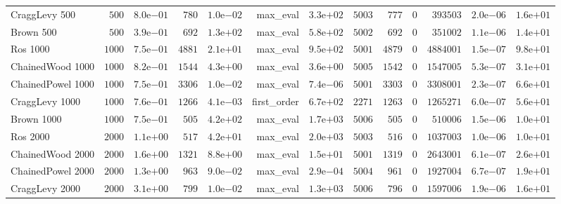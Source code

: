 \begin{longtable}[c]{lrrrrrrrrrrrr}
CraggLevy 500 & \(  500\) & \( 8.0\)e\(-01\) & \(  780\) & \( 1.0\)e\(-02\) & max\_eval & \( 3.3\)e\(+02\) & \( 5003\) & \(  777\) & \(    0\) & \(393503\) & \( 2.0\)e\(-06\) & \( 1.6\)e\(+01\) \\
Brown 500 & \(  500\) & \( 3.9\)e\(-01\) & \(  692\) & \( 1.3\)e\(+02\) & max\_eval & \( 5.8\)e\(+02\) & \( 5002\) & \(  692\) & \(    0\) & \(351002\) & \( 1.1\)e\(-06\) & \( 1.4\)e\(+01\) \\
Ros 1000 & \( 1000\) & \( 7.5\)e\(-01\) & \( 4881\) & \( 2.1\)e\(+01\) & max\_eval & \( 9.5\)e\(+02\) & \( 5001\) & \( 4879\) & \(    0\) & \(4884001\) & \( 1.5\)e\(-07\) & \( 9.8\)e\(+01\) \\
ChainedWood 1000 & \( 1000\) & \( 8.2\)e\(-01\) & \( 1544\) & \( 4.3\)e\(+00\) & max\_eval & \( 3.6\)e\(+00\) & \( 5005\) & \( 1542\) & \(    0\) & \(1547005\) & \( 5.3\)e\(-07\) & \( 3.1\)e\(+01\) \\
ChainedPowel 1000 & \( 1000\) & \( 7.5\)e\(-01\) & \( 3306\) & \( 1.0\)e\(-02\) & max\_eval & \( 7.4\)e\(-06\) & \( 5001\) & \( 3303\) & \(    0\) & \(3308001\) & \( 2.3\)e\(-07\) & \( 6.6\)e\(+01\) \\
CraggLevy 1000 & \( 1000\) & \( 7.6\)e\(-01\) & \( 1266\) & \( 4.1\)e\(-03\) & first\_order & \( 6.7\)e\(+02\) & \( 2271\) & \( 1263\) & \(    0\) & \(1265271\) & \( 6.0\)e\(-07\) & \( 5.6\)e\(+01\) \\
Brown 1000 & \( 1000\) & \( 7.5\)e\(-01\) & \(  505\) & \( 4.2\)e\(+02\) & max\_eval & \( 1.7\)e\(+03\) & \( 5006\) & \(  505\) & \(    0\) & \(510006\) & \( 1.5\)e\(-06\) & \( 1.0\)e\(+01\) \\
Ros 2000 & \( 2000\) & \( 1.1\)e\(+00\) & \(  517\) & \( 4.2\)e\(+01\) & max\_eval & \( 2.0\)e\(+03\) & \( 5003\) & \(  516\) & \(    0\) & \(1037003\) & \( 1.0\)e\(-06\) & \( 1.0\)e\(+01\) \\
ChainedWood 2000 & \( 2000\) & \( 1.6\)e\(+00\) & \( 1321\) & \( 8.8\)e\(+00\) & max\_eval & \( 1.5\)e\(+01\) & \( 5001\) & \( 1319\) & \(    0\) & \(2643001\) & \( 6.1\)e\(-07\) & \( 2.6\)e\(+01\) \\
ChainedPowel 2000 & \( 2000\) & \( 1.3\)e\(+00\) & \(  963\) & \( 9.0\)e\(-02\) & max\_eval & \( 2.9\)e\(-04\) & \( 5004\) & \(  961\) & \(    0\) & \(1927004\) & \( 6.7\)e\(-07\) & \( 1.9\)e\(+01\) \\
CraggLevy 2000 & \( 2000\) & \( 3.1\)e\(+00\) & \(  799\) & \( 1.0\)e\(-02\) & max\_eval & \( 1.3\)e\(+03\) & \( 5006\) & \(  796\) & \(    0\) & \(1597006\) & \( 1.9\)e\(-06\) & \( 1.6\)e\(+01\) \\

\end{longtable}
